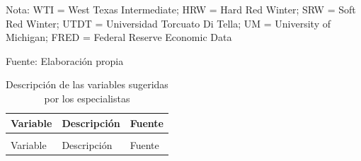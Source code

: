 \documentclass[12pt]{article}
\begin{document}
\begin{ThreePartTable}
\begin{TableNotes}
\item Nota: WTI = West Texas Intermediate; HRW = Hard Red Winter; SRW = Soft Red Winter; UTDT = Universidad Torcuato Di Tella; UM = University of Michigan; FRED = Federal Reserve Economic Data
\item Fuente: Elaboración propia
\end{TableNotes}

\begin{longtable}[t]{>{\raggedright\arraybackslash}p{3.5cm}>{\raggedright\arraybackslash}p{7.5cm}>{\raggedright\arraybackslash}p{5cm}}

\caption{\label{tbl-covs_economicas}Descripción de las variables
sugeridas por los especialistas}

\tabularnewline

\toprule
Variable & Descripción & Fuente\\
\midrule
\endfirsthead
\multicolumn{3}{@{}l}{(continuación)}\\
\toprule
Variable & Descripción & Fuente\\
\midrule
\endhead


\end{longtable}
\end{ThreePartTable}
\end{document}
